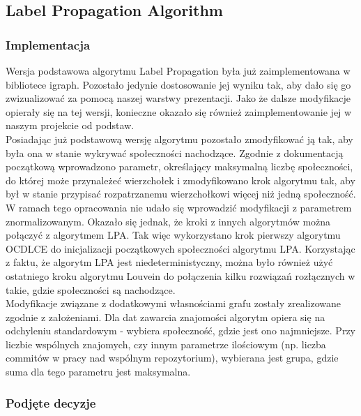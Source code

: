 \documentclass{article}
\begin{document}
\subsection{Label Propagation Algorithm}
\subsubsection{Implementacja}

Wersja podstawowa algorytmu Label Propagation była już zaimplementowana w bibliotece igraph. Pozostało jedynie dostosowanie jej wyniku tak, aby dało się go zwizualizować za pomocą naszej warstwy prezentacji. Jako że dalsze modyfikacje opierały się na tej wersji, konieczne okazało się również zaimplementowanie jej w naszym projekcie od podstaw.\\

Posiadając już podstawową wersję algorytmu pozostało zmodyfikować ją tak, aby była ona w stanie wykrywać społeczności nachodzące. Zgodnie z dokumentacją początkową wprowadzono parametr, określający maksymalną liczbę społeczności, do której może przynależeć wierzchołek i zmodyfikowano krok algorytmu tak, aby był w stanie przypisać rozpatrzanemu wierzchołkowi więcej niż jedną społeczność.\\

W ramach tego opracowania nie udało się wprowadzić modyfikacji z parametrem znormalizowanym. Okazało się jednak, że kroki z innych algorytmów można połączyć z algorytmem LPA. Tak więc wykorzystano krok pierwszy algorytmu OCDLCE do inicjalizacji początkowych społeczności algorytmu LPA. Korzystając z faktu, że algorytm LPA jest niedeterministyczny, można było również użyć ostatniego kroku algorytmu Louvein do połączenia kilku rozwiązań rozłącznych w takie, gdzie społeczności są nachodzące.\\

Modyfikacje związane z dodatkowymi własnościami grafu zostały zrealizowane zgodnie z założeniami. Dla dat zawarcia znajomości algorytm opiera się na odchyleniu standardowym - wybiera społeczność, gdzie jest ono najmniejsze. Przy liczbie wspólnych znajomych, czy innym parametrze ilościowym (np. liczba commitów w pracy nad wspólnym repozytorium), wybierana jest grupa, gdzie suma dla tego parametru jest maksymalna.

\subsubsection{Podjęte decyzje}
\end{document}
